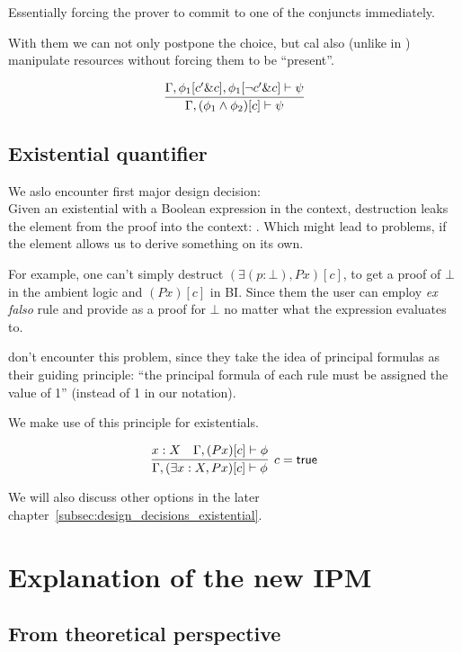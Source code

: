 Essentially forcing the prover to commit to one of the conjuncts immediately.

With them we can not only postpone the choice, but cal also (unlike in \cite{harlandResourceDistributionBooleanConstraints2003}) manipulate resources without forcing them to be ``present''.

\[
\infer{\Gamma, (\phi_1 \wedge \phi_2)[c] \vdash \psi}
      {\Gamma, \phi_1[c' \& c], \phi_1[\neg c' \& c] \vdash \psi}
\]

\subsection{Existential quantifier}
\label{subsec:exist-quant}

We aslo encounter first major design decision:\\
Given an existential with a Boolean expression in the context, destruction leaks the element from the proof into the context: .
Which might lead to problems, if the element allows us to derive something on its own.

For example, one can't simply destruct \((\exists (p : \bot), P x)[c]\), to get a proof of \(\bot\) in the ambient logic and \((P x)[c]\) in BI\@.
Since them the user can employ \emph{ex falso} rule and provide  as a proof for \(\bot\) no matter what the expression evaluates to.

\citet[page 5]{harlandResourceDistributionBooleanConstraints2003} don't encounter this problem, since they take the idea of principal formulas as their guiding principle: ``the principal formula of each rule must be assigned the value of 1'' (\true instead of 1 in our notation).

We make use of this principle for existentials.

\[
\infer[c = \true]
      {\Gamma, (\exists x : X, P x)[c] \vdash \phi}
      {x : X &
       \Gamma, (P x)[c] \vdash \phi}
\]

We will also discuss other options in the later chapter~\ref{subsec:design_decisions_existential}.


\section{Explanation of the new IPM}

\subsection{From theoretical perspective}

